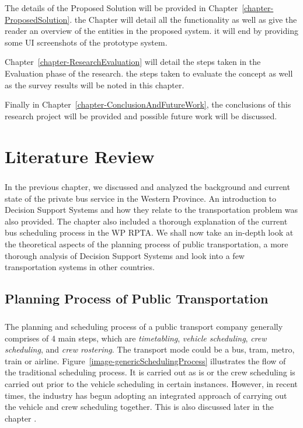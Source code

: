\documentclass[12pt, oneside]{report}
\begin{document}
The details of the Proposed Solution will be provided in Chapter~\ref{chapter-ProposedSolution}. the Chapter will detail all the functionality as well as give the reader an overview of the entities in the proposed system. it will end by providing some UI screenshots of the prototype system.

Chapter~\ref{chapter-ResearchEvaluation} will detail the steps taken in the Evaluation phase of the research. the steps taken to evaluate the concept as well as the survey results will be noted in this chapter.

Finally in Chapter~\ref{chapter-ConclusionAndFutureWork}, the conclusions of this research project will be provided and possible future work will be discussed.

\newpage


\chapter {Literature Review}
\label{chapter-LitReview}

\paragraph{ } In the previous chapter, we discussed and analyzed the background and current state of the private bus service in the Western Province. An introduction to Decision Support Systems and how they relate to the transportation problem was also provided. The chapter also included a thorough explanation of the current bus scheduling process in the WP RPTA. We shall now take an in-depth look at the theoretical aspects of the planning process of public transportation, a more thorough analysis of Decision Support Systems and look into a few transportation systems in other countries.

\section{Planning Process of Public Transportation}

\paragraph{ } The planning and scheduling process of a public transport company generally comprises of 4 main steps, which are \textit{timetabling}, \textit{vehicle scheduling}, \textit{crew scheduling}, and \textit{crew rostering}. The transport mode could be a bus, tram, metro, train or airline. Figure~\ref{image-genericSchedulingProcess} illustrates the flow of the traditional scheduling process. It is carried out as is or the crew scheduling is carried out prior to the vehicle scheduling in certain instances. However, in recent times, the industry has begun adopting an integrated approach of carrying out the vehicle and crew scheduling together. This is also discussed later in the chapter \citep{Huisman2004}.
\end{document}
